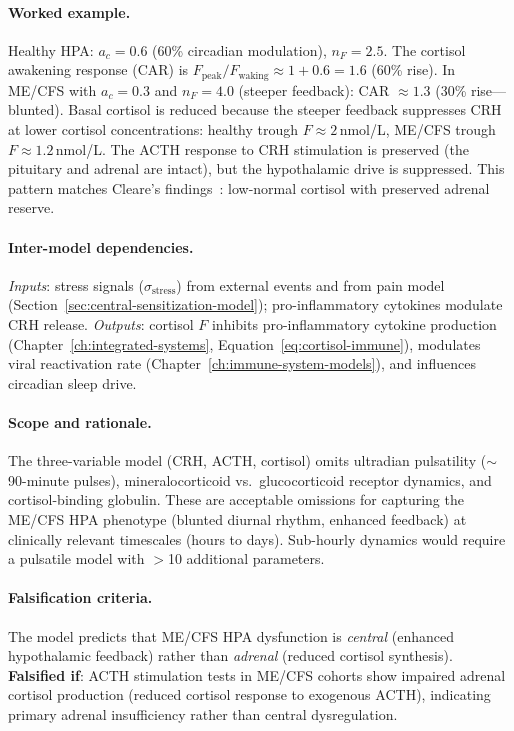 \paragraph{Worked example.}
Healthy HPA: $a_c = 0.6$ (60\% circadian modulation), $n_F = 2.5$. The cortisol awakening response (CAR) is $F_{\text{peak}} / F_{\text{waking}} \approx 1 + 0.6 = 1.6$ (60\% rise). In ME/CFS with $a_c = 0.3$ and $n_F = 4.0$ (steeper feedback): CAR $\approx 1.3$ (30\% rise---blunted). Basal cortisol is reduced because the steeper feedback suppresses CRH at lower cortisol concentrations: healthy trough $F \approx 2$\,nmol/L, ME/CFS trough $F \approx 1.2$\,nmol/L. The ACTH response to CRH stimulation is preserved (the pituitary and adrenal are intact), but the hypothalamic drive is suppressed. This pattern matches Cleare's findings~\cite{Cleare1999}: low-normal cortisol with preserved adrenal reserve.

\paragraph{Inter-model dependencies.}
\emph{Inputs}: stress signals ($\sigma_{\text{stress}}$) from external events and from pain model (Section~\ref{sec:central-sensitization-model}); pro-inflammatory cytokines modulate CRH release. \emph{Outputs}: cortisol $F$ inhibits pro-inflammatory cytokine production (Chapter~\ref{ch:integrated-systems}, Equation~\ref{eq:cortisol-immune}), modulates viral reactivation rate (Chapter~\ref{ch:immune-system-models}), and influences circadian sleep drive.

\paragraph{Scope and rationale.}
The three-variable model (CRH, ACTH, cortisol) omits ultradian pulsatility ($\sim$90-minute pulses), mineralocorticoid vs.\ glucocorticoid receptor dynamics, and cortisol-binding globulin. These are acceptable omissions for capturing the ME/CFS HPA phenotype (blunted diurnal rhythm, enhanced feedback) at clinically relevant timescales (hours to days). Sub-hourly dynamics would require a pulsatile model with $>$10 additional parameters.

\paragraph{Falsification criteria.}
The model predicts that ME/CFS HPA dysfunction is \emph{central} (enhanced hypothalamic feedback) rather than \emph{adrenal} (reduced cortisol synthesis). \textbf{Falsified if}: ACTH stimulation tests in ME/CFS cohorts show impaired adrenal cortisol production (reduced cortisol response to exogenous ACTH), indicating primary adrenal insufficiency rather than central dysregulation.

